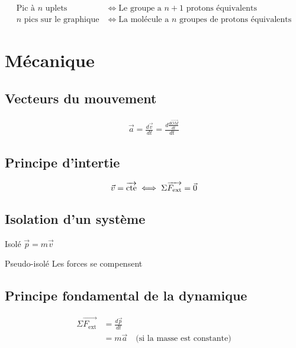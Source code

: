 \documentclass{article}
\newcommand{\vect}{\overrightarrow}
\newenvironment{definitions}{\begin{description}[leftmargin=!,labelwidth=\widthof{\bfseries Lorem ipsum dolor}]}{\end{description}}
\begin{document}
\begin{equation*}
    \begin{split}
        \text{Pic à $n$ uplets} &\iff \text{Le groupe a $n + 1$ protons équivalents}\\
        \text{$n$ pics sur le graphique} &\iff \text{La molécule a $n$ groupes de protons équivalents}
    \end{split}
\end{equation*}

\newpage
\section{Mécanique}
\subsection{Vecteurs du mouvement}
\begin{equation*}
    \begin{split}
        \vec a = \frac{d\vec v}{dt} = \frac{d\frac{d\vect{OM}}{dt}}{dt}
    \end{split}
\end{equation*}

\subsection{Principe d'intertie}

$$
\vec{v} = \vect{\text{cte}} \iff \Sigma \vect{F_{\text{ext}}} = \vec{0} \\
$$

\subsection{Isolation d'un système}
\begin{definitions}
\item[Isolé] $\vec p = m \vec v$
\item[Pseudo-isolé] Les forces se compensent
\end{definitions}

\subsection{Principe fondamental de la dynamique}
\begin{equation*}
    \begin{split}
        \Sigma \vect{F_\text{ext}} &= \frac{d\vec p}{dt} \\
                                   &= m \vec a \quad \text{(si la masse est constante)}
    \end{split}
\end{equation*}
\end{document}
